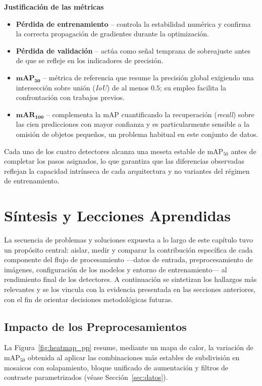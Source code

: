 \textbf{Justificación de las métricas}

\begin{itemize}
  \item \textbf{Pérdida de entrenamiento} – controla la estabilidad numérica y confirma la correcta propagación de gradientes durante la optimización.
  \item \textbf{Pérdida de validación} – actúa como señal temprana de sobreajuste antes de que se refleje en los indicadores de precisión.
  \item \(\mathbf{mAP_{50}}\) – métrica de referencia que resume la precisión global exigiendo una intersección sobre unión (\emph{IoU}) de al menos \(0.5\); su empleo facilita la confrontación con trabajos previos.
  \item \(\mathbf{mAR_{100}}\) – complementa la mAP cuantificando la recuperación (\emph{recall}) sobre las cien predicciones con mayor confianza y es particularmente sensible a la omisión de objetos pequeños, un problema habitual en este conjunto de datos.
\end{itemize}

Cada uno de los cuatro detectores alcanza una meseta estable de \(\text{mAP}_{50}\) antes de completar los pasos asignados, lo que garantiza que las diferencias observadas reflejan la capacidad intrínseca de cada arquitectura y no variantes del régimen de entrenamiento.

\section{Síntesis y Lecciones Aprendidas}\label{sec:sintesis}

La secuencia de problemas y soluciones expuesta a lo largo de este capítulo tuvo un propósito central:
aislar, medir y comparar la contribución específica de cada componente del flujo de procesamiento —datos de entrada, preprocesamiento de imágenes, configuración de los modelos y entorno de entrenamiento— al rendimiento final de los detectores.
A continuación se sintetizan los hallazgos más relevantes y se los vincula con la evidencia presentada en las secciones anteriores, con el fin de orientar decisiones metodológicas futuras.

\subsection{Impacto de los Preprocesamientos}

La Figura~\ref{fig:heatmap_pp} resume, mediante un mapa de calor, la variación de \(\text{mAP}_{50}\) obtenida al aplicar las combinaciones más estables de subdivisión en mosaicos con solapamiento, bloque unificado de aumentación y filtros de contraste parametrizados (véase Sección~\ref{sec:datos}).

